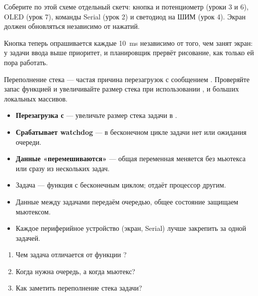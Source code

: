 Соберите по этой схеме отдельный скетч: кнопка и потенциометр (уроки 3 и 6), OLED (урок 7), команды
Serial (урок 2) и светодиод на ШИМ (урок 4). Экран должен обновляться независимо от нажатий.

Кнопка теперь опрашивается каждые \SI{10}{ms} независимо от того, чем занят экран: у задачи ввода
выше приоритет, и планировщик прервёт рисование, как только ей пора работать.

\begin{caution}
Переполнение стека --- частая причина перезагрузок с сообщением .
Проверяйте запас функцией  и увеличивайте размер стека при
использовании ,  и больших локальных массивов.
\end{caution}

\begin{trouble}
\begin{itemize}[leftmargin=*]
  \item \textbf{Перезагрузка с } --- увеличьте размер стека задачи в .
  \item \textbf{Срабатывает watchdog} --- в бесконечном цикле задачи нет  или ожидания очереди.
  \item \textbf{Данные «перемешиваются»} --- общая переменная меняется без мьютекса или сразу из нескольких задач.
\end{itemize}
\end{trouble}

\begin{summary}
\begin{itemize}[leftmargin=*]
  \item Задача --- функция с бесконечным циклом;  отдаёт процессор другим.
  \item Данные между задачами передаём очередью, общее состояние защищаем мьютексом.
  \item Каждое периферийное устройство (экран, Serial) лучше закрепить за одной задачей.
\end{itemize}
\end{summary}

\begin{selfcheck}
\begin{enumerate}
  \item Чем задача отличается от функции ?
  \item Когда нужна очередь, а когда мьютекс?
  \item Как заметить переполнение стека задачи?
\end{enumerate}
\end{selfcheck}

